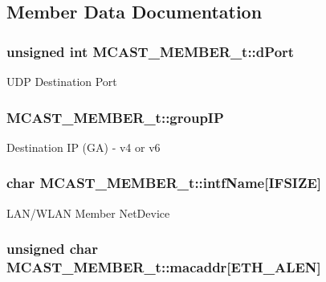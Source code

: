 \subsection{Member Data Documentation}
\hypertarget{structMCAST__MEMBER__t_a07ede5f961dc4deae13a5f799c6610ba}{
\subsubsection[{d\-Port}]{\setlength{\rightskip}{0pt plus 5cm}unsigned int M\-C\-A\-S\-T\-\_\-\-M\-E\-M\-B\-E\-R\-\_\-t\-::d\-Port}}\label{structMCAST__MEMBER__t_a07ede5f961dc4deae13a5f799c6610ba}
U\-D\-P Destination Port \hypertarget{structMCAST__MEMBER__t_abdec041f2d9705e2f9b3dfb0140040ad}{
\subsubsection[{group\-I\-P}]{ M\-C\-A\-S\-T\-\_\-\-M\-E\-M\-B\-E\-R\-\_\-t\-::group\-I\-P}}\label{structMCAST__MEMBER__t_abdec041f2d9705e2f9b3dfb0140040ad}
Destination I\-P (G\-A) -\/ v4 or v6 \hypertarget{structMCAST__MEMBER__t_af64a5251fc8af6ac16052e9d8d97ae51}{
\subsubsection[{intf\-Name}]{\setlength{\rightskip}{0pt plus 5cm}char M\-C\-A\-S\-T\-\_\-\-M\-E\-M\-B\-E\-R\-\_\-t\-::intf\-Name\mbox{[}{\bf I\-F\-S\-I\-Z\-E}\mbox{]}}}\label{structMCAST__MEMBER__t_af64a5251fc8af6ac16052e9d8d97ae51}
L\-A\-N/\-W\-L\-A\-N Member Net\-Device \hypertarget{structMCAST__MEMBER__t_a4ce6350f2ca6f1b97c4d12cab85f3a71}{
\subsubsection[{macaddr}]{\setlength{\rightskip}{0pt plus 5cm}unsigned char M\-C\-A\-S\-T\-\_\-\-M\-E\-M\-B\-E\-R\-\_\-t\-::macaddr\mbox{[}E\-T\-H\-\_\-\-A\-L\-E\-N\mbox{]}}}\label{structMCAST__MEMBER__t_a4ce6350f2ca6f1b97c4d12cab85f3a71}
